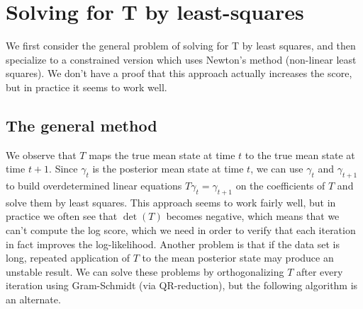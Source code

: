 \documentclass[12pt,leqno]{article}
\begin{document}
\section{Solving for T by least-squares}
We first consider the general problem of solving for T by least squares, and then specialize to a constrained
version which uses Newton's method (non-linear least squares).  We don't have a proof that this approach actually
increases the score, but in practice it seems to work well.

\subsection{The general method} We observe that $T$ maps the true mean state at time $t$ to the true mean state at
time $t+1$.  Since $\gamma_t$ is the posterior mean state at time $t$, we can use $\gamma_t$ and
$\gamma_{t+1}$ to build overdetermined linear equations $T\gamma_t = \gamma_{t+1}$ on the coefficients of $T$
and solve them by least squares.
This approach seems to work fairly well, but in practice we often see that $\det(T)$ becomes negative,
which means that we can't compute the log score, which we need in order to verify that each iteration in fact
improves the log-likelihood.  Another problem is that if the data set is long, repeated application of $T$ to the
mean posterior state may produce an unstable result.  We can solve these problems by orthogonalizing $T$
after every iteration using Gram-Schmidt (via QR-reduction), but the following algorithm is an alternate.
\end{document}
